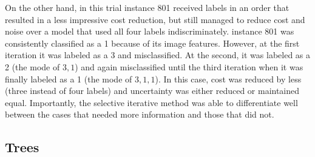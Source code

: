 \documentclass[]{spie}
\begin{document}
On the other hand, in this trial instance 801 received labels in an order that resulted in a less impressive cost reduction, but still managed to reduce cost and noise over a model that used all four labels indiscriminately. instance 801 was consistently classified as a 1 because of its image features. However, at the first iteration it was labeled as a 3 and misclassified. At the second, it was labeled as a 2 (the mode of ${3,1}$) and again misclassified until the third iteration when it was finally labeled as a 1 (the mode of ${3, 1, 1}$). In this case, cost was reduced by less (three instead of four labels) and uncertainty was either reduced or maintained equal. Importantly, the selective iterative method was able to differentiate well between the cases that needed more information and those that did not.

\subsection{Trees}
\end{document}
